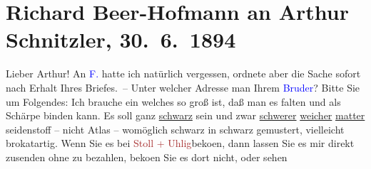 

               \section[Richard Beer-Hofmann an Arthur Schnitzler, 30. 6. 1894]{ Richard Beer-Hofmann an Arthur Schnitzler,
                    30. 6. 1894}\nopagebreak{}\rehead{ }\normalsize\beginnumbering{} \toendnotes[C]{\smallbreak\pagebreak[2]} 
\toendnotes[C]{\smallbreak}\pstart{}{\pb}Lieber
                        Arthur!\pend\pstart
           An \textcolor{blue}{F.}{}\ledrightnote{\textcolor{blue}{Friedrich Michael Fels}} hatte ich natürlich vergessen, ordnete
                    aber die Sache sofort nach Erhalt Ihres Briefes. –\pend
           \pstart
           Unter welcher Adresse \label{K_L00342_1v}\label{K_L00342_1h} man Ihrem \textcolor{blue}{Bruder}{}?\pend
           \pstart
           Bitte Sie um Folgendes: Ich brauche ein \label{K_L00342_2v}\label{K_L00342_2h} welches so groß ist, daß {\pb}man es falten und als
                    Schärpe binden kann. Es soll ganz \uline{schwarz}
                sein
                    und zwar \uline{schwerer}{ }\uline{weicher}{ }\uline{matter}
                seidenstoff – nicht
                    Atlas – womöglich schwarz in schwarz gemustert, vielleicht brokatartig. Wenn Sie
                    es bei \textcolor{brown}{Stoll + Uhlig}{}beko{\geminationm}en, dann lassen Sie es mir direkt zusenden ohne
                    zu bezahlen, beko{\geminationm}en Sie es dort nicht, oder sehen
